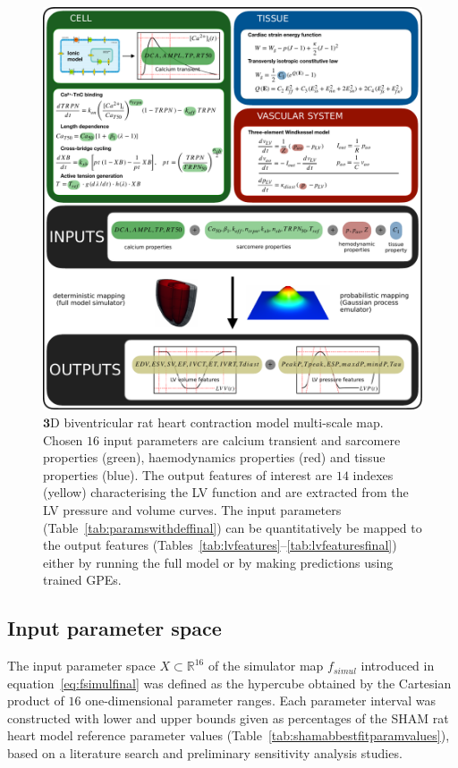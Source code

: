 \begin{figure}[ht!]
    \myfloatalign
    \includegraphics[width=\textwidth]{figures/chapter07/Fig_1.pdf}
    \caption{$\mathbf{3}$D biventricular rat heart contraction model multi-scale map. Chosen $16$ input parameters are calcium transient and sarcomere properties (green), haemodynamics properties (red) and tissue properties (blue). The output features of interest are $14$ indexes (yellow) characterising the LV function and are extracted from the LV pressure and volume curves. The input parameters (Table~\ref{tab:paramswithdeffinal}) can be quantitatively be mapped to the output features (Tables~\ref{tab:lvfeatures}--\ref{tab:lvfeaturesfinal}) either by running the full model or by making predictions using trained GPEs.}
    \label{fig:multiscalemap}
\end{figure}


%
%
%
\subsection{Input parameter space}\label{sec:ch7inputparameterspace}
The input parameter space $X\subset\mathbb{R}^{16}$ of the simulator map $f_{simul}$ introduced in equation~\eqref{eq:fsimulfinal} was defined as the hypercube obtained by the Cartesian product of $16$ one-dimensional parameter ranges. Each parameter interval was constructed with lower and upper bounds given as percentages of the SHAM rat heart model reference parameter values (Table~\ref{tab:shamabbestfitparamvalues}), based on a literature search and preliminary sensitivity analysis studies.

